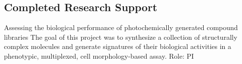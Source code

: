 \documentclass{nihbiosketch}
\begin{document}

\subsection*{Completed Research Support}

{Assessing the biological performance of photochemically generated compound libraries}
{The goal of this project was to synthesize a collection of structurally complex molecules and generate signatures of their biological activities in a phenotypic, multiplexed, cell morphology-based assay. }
{Role: PI}

\end{document}
